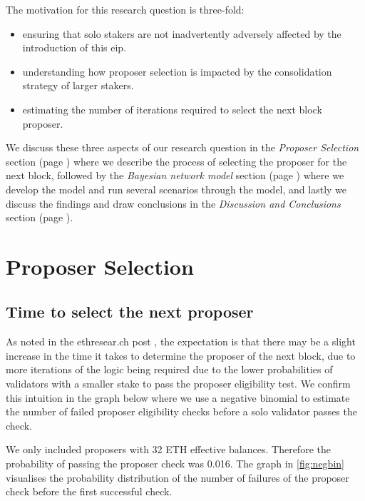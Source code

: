 \documentclass[submission,copyright,creativecommons]{eptcs}
\begin{document}
The motivation  for this research question is three-fold:
\begin{itemize}[noitemsep]
\item ensuring that solo stakers are not inadvertently adversely affected by the introduction of this \gls{eip}.
\item understanding how proposer selection is impacted by the consolidation strategy of larger stakers.
\item estimating the number of iterations required to select the next block proposer.
\end{itemize}
 
We discuss these three aspects of our research question in the \textit{Proposer Selection} section (page \pageref{sec:method}) where we describe the process of selecting the proposer for the next block, followed by the \textit{Bayesian network model} section (page \pageref{sec:results}) where we develop the model and run several scenarios through the model, and lastly we discuss the findings and draw conclusions in the \textit{Discussion and Conclusions} section (page \pageref{sec:discussion}).


\section{Proposer Selection}
\label{sec:method} 

\subsection{Time to select the next proposer}
As noted in the ethresear.ch post \cite{Neuder2023a}, the expectation is that there may be a slight increase in the time it takes to determine the proposer of the next block, due to more iterations of the logic being required due to the lower probabilities of validators with a smaller stake to pass the proposer eligibility test. We confirm this intuition in the graph below where we use a negative binomial to estimate the number of failed proposer eligibility checks before a solo validator passes the check.

We only included proposers with 32 ETH effective balances. Therefore the probability of passing the proposer check was 0.016. The graph in \cref{fig:negbin} visualises the probability distribution of the number of failures of the proposer check before the first successful check.
\end{document}
